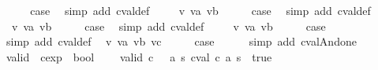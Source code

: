 \begin{isabellebody}
\ \ \isamarkupfalse%
\ \isamarkupfalse%
\ {\isacharquery}case\ \isamarkupfalse%
\ {\isacharparenleft}simp\ add{\isacharcolon}\ cval{\isacharunderscore}def{\isacharparenright}\isanewline
{}\isamarkupfalse%
\isanewline
\ \ \isamarkupfalse%
\ {\isacharparenleft}{\isachardoublequoteopen}{}{\isacharunderscore}{}{}{\isachardoublequoteclose}\ v\ va\ vb{\isacharparenright}\isanewline
\ \ \isamarkupfalse%
\ \isamarkupfalse%
\ {\isacharquery}case\ \isamarkupfalse%
\ {\isacharparenleft}simp\ add{\isacharcolon}\ cval{\isacharunderscore}def{\isacharparenright}\isanewline
{}\isamarkupfalse%
\isanewline
{}\isamarkupfalse%
\ {\isacharparenleft}{\isachardoublequoteopen}{}{\isacharunderscore}{}{}{\isachardoublequoteclose}\ v\ va\ vb{\isacharparenright}\isanewline
\ \ \isamarkupfalse%
\ \isamarkupfalse%
\ {\isacharquery}case\ \isamarkupfalse%
\ {\isacharparenleft}simp\ add{\isacharcolon}\ cval{\isacharunderscore}def{\isacharparenright}\isanewline
{}\isamarkupfalse%
\isanewline
\ \ \isamarkupfalse%
\ {\isacharparenleft}{\isachardoublequoteopen}{}{\isacharunderscore}{}{}{\isachardoublequoteclose}\ v\ va\ vb{\isacharparenright}\isanewline
\ \ \isamarkupfalse%
\ \isamarkupfalse%
\ {\isacharquery}case\ \isamarkupfalse%
\ {\isacharparenleft}simp\ add{\isacharcolon}\ cval{\isacharunderscore}def{\isacharparenright}\isanewline
{}\isamarkupfalse%
\isanewline
{}\isamarkupfalse%
\ {\isacharparenleft}{\isachardoublequoteopen}{}{\isacharunderscore}{}{}{\isachardoublequoteclose}\ v\ va\ vb\ vc{\isacharparenright}\isanewline
\ \ \isamarkupfalse%
\ \isamarkupfalse%
\ {\isacharquery}case\isanewline
\ \ \ \ \isamarkupfalse%
\ {\isacharparenleft}simp\ add{\isacharcolon}\ cval{\isacharunderscore}And{\isacharunderscore}one{\isacharparenright}\isanewline
{}\isamarkupfalse%
%
\endisatagproof
{\isafoldproof}%
%
\isadelimproof
\isanewline
%
\endisadelimproof
\isanewline
{}\isamarkupfalse%
\ valid\ {\isacharcolon}{\isacharcolon}\ {\isachardoublequoteopen}cexp\ {\isasymRightarrow}\ bool{\isachardoublequoteclose}\ \ \isanewline
\ \ {\isachardoublequoteopen}valid\ c\ {\isasymequiv}\ {\isacharparenleft}{\isasymforall}\ a\ s{\isachardot}\ cval\ c\ a\ s\ {\isacharequal}\ true{\isacharparenright}{\isachardoublequoteclose}\isanewline

\end{isabellebody}
